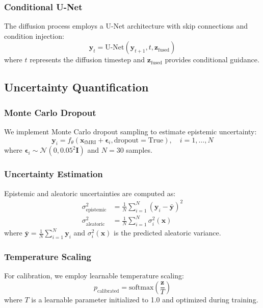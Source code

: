 \subsubsection{Conditional U-Net}
The diffusion process employs a U-Net architecture with skip connections and condition injection:
\begin{equation}
\mathbf{y}_t = \text{U-Net}(\mathbf{y}_{t+1}, t, \mathbf{z}_{\text{fused}})
\end{equation}
where $t$ represents the diffusion timestep and $\mathbf{z}_{\text{fused}}$ provides conditional guidance.

\subsection{Uncertainty Quantification}

\subsubsection{Monte Carlo Dropout}
We implement Monte Carlo dropout sampling to estimate epistemic uncertainty:
\begin{equation}
\mathbf{y}_i = f_{\theta}(\mathbf{x}_{\text{fMRI}} + \boldsymbol{\epsilon}_i, \text{dropout}=\text{True}), \quad i = 1, \ldots, N
\end{equation}
where $\boldsymbol{\epsilon}_i \sim \mathcal{N}(0, 0.05^2 \mathbf{I})$ and $N = 30$ samples.

\subsubsection{Uncertainty Estimation}
Epistemic and aleatoric uncertainties are computed as:
\begin{align}
\sigma_{\text{epistemic}}^2 &= \frac{1}{N} \sum_{i=1}^N (\mathbf{y}_i - \bar{\mathbf{y}})^2 \\
\sigma_{\text{aleatoric}}^2 &= \frac{1}{N} \sum_{i=1}^N \sigma_i^2(\mathbf{x})
\end{align}
where $\bar{\mathbf{y}} = \frac{1}{N} \sum_{i=1}^N \mathbf{y}_i$ and $\sigma_i^2(\mathbf{x})$ is the predicted aleatoric variance.

\subsubsection{Temperature Scaling}
For calibration, we employ learnable temperature scaling:
\begin{equation}
p_{\text{calibrated}} = \text{softmax}\left(\frac{\mathbf{z}}{T}\right)
\end{equation}
where $T$ is a learnable parameter initialized to 1.0 and optimized during training.

